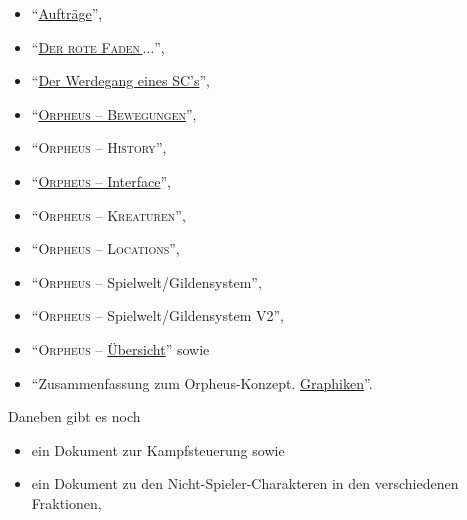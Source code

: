 \documentclass[a5paper,pagesize,numbers=noenddot]{scrbook}
\begin{document}
\begin{itemize}
   \item \enquote{\uline{Aufträge}},\autocite[S.~16--17]{orpheus_b_scribbles}
   \item \enquote{\uline{\textsc{Der rote Faden\,$\ldots$}}},\autocite{orpheus_der_rote}
   \item \enquote{\uline{Der Werdegang eines SC's}},\autocite{orpheus_der_werdegang}
   \item \enquote{\uline{\textsc{Orpheus -- Bewegungen}}},\autocite{orpheus_bewegungen}
   \item \enquote{\textsc{Orpheus -- History}},\autocite[S.~2--3]{orpheus_b_scribbles}
   \item \enquote{\uline{\textsc{Orpheus} -- Interface}},\autocite{orpheus_interface}
   \item \enquote{\textsc{Orpheus -- Kreaturen}},\autocite[S.~4]{orpheus_b_scribbles}
   \item \enquote{\textsc{Orpheus -- Locations}},\autocite[S.~5]{orpheus_b_scribbles}
   \item \enquote{\textsc{Orpheus} -- Spielwelt/Gildensystem},\autocite{orpheus_gildensystem}
   \item \enquote{\textsc{Orpheus} -- Spielwelt/Gildensystem V2},\autocite{orpheus_gildensystem_v2}
   \item \enquote{\textsc{Orpheus} -- \uline{Übersicht}}\autocite[S.~11--14]{orpheus_b_scribbles} sowie
   \item \enquote{Zusammenfassung zum Orpheus-Konzept. \uline{Graphiken}}.\autocite{orpheus_zusammenfassung_1996}
\end{itemize}

\noindent Daneben gibt es noch

\begin{itemize}
   \item ein Dokument zur Kampfsteuerung\autocite{orpheus_kampfsteuerung} sowie
   \item ein Dokument zu den Nicht-Spieler-Charakteren in den verschiedenen Fraktionen,\autocite{orpheus_nscs}
\end{itemize}
\end{document}

